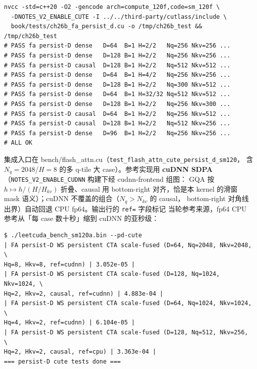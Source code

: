 \begin{lstlisting}[style=console]
nvcc -std=c++20 -O2 -gencode arch=compute_120f,code=sm_120f \
  -DNOTES_V2_ENABLE_CUTE -I ../../third-party/cutlass/include \
  book/tests/ch26b_fa_persist_d.cu -o /tmp/ch26b_test && /tmp/ch26b_test
# PASS fa persist-D dense   D=64  B=1 H=2/2   Nq=256 Nkv=256 ...
# PASS fa persist-D dense   D=128 B=1 H=2/2   Nq=256 Nkv=256 ...
# PASS fa persist-D causal  D=128 B=1 H=2/2   Nq=512 Nkv=512 ...
# PASS fa persist-D dense   D=64  B=1 H=4/2   Nq=256 Nkv=256 ...
# PASS fa persist-D dense   D=128 B=1 H=2/2   Nq=300 Nkv=512 ...
# PASS fa persist-D dense   D=64  B=1 H=32/32 Nq=512 Nkv=512 ...
# PASS fa persist-D dense   D=128 B=1 H=2/2   Nq=256 Nkv=300 ...
# PASS fa persist-D causal  D=64  B=1 H=2/2   Nq=256 Nkv=512 ...
# PASS fa persist-D causal  D=128 B=1 H=2/2   Nq=512 Nkv=256 ...
# PASS fa persist-D dense   D=96  B=1 H=2/2   Nq=256 Nkv=256 ...
# ALL OK
\end{lstlisting}

集成入口在 bench/flash\_attn.cu（\texttt{test\_\allowbreak{}flash\_\allowbreak{}attn\_\allowbreak{}cute\_\allowbreak{}persist\_\allowbreak{}d\_\allowbreak{}sm120}，
含 $N_q{=}2048$/$H{=}8$ 的多 q-tile 大 case）。参考实现用 \textbf{cuDNN SDPA}
（\texttt{NOTES\_\allowbreak{}V2\_\allowbreak{}ENABLE\_CUDNN} 构建下经 cudnn-frontend 组图：
GQA 按 $h\mapsto h/(H/H_{kv})$ 折叠、causal 用 bottom-right 对齐，恰是本
kernel 的滑窗 mask 语义）；cuDNN 不覆盖的组合（$N_q>N_{kv}$ 的 causal，
bottom-right 对角线出界）自动回退 CPU fp64。输出行的 \texttt{ref=} 字段标记
当轮参考来源，fp64 CPU 参考从「每 case 数十秒」缩到 cuDNN 的亚秒级：

\begin{lstlisting}[style=console]
$ ./leetcuda_bench_sm120a.bin --pd-cute
| FA persist-D WS persistent CTA scale-fused (D=64, Nq=2048, Nkv=2048, \
Hq=8, Hkv=8, ref=cudnn) | 3.052e-05 |
| FA persist-D WS persistent CTA scale-fused (D=128, Nq=1024, Nkv=1024, \
Hq=2, Hkv=2, causal, ref=cudnn) | 4.883e-04 |
| FA persist-D WS persistent CTA scale-fused (D=64, Nq=1024, Nkv=1024, \
Hq=4, Hkv=2, ref=cudnn) | 6.104e-05 |
| FA persist-D WS persistent CTA scale-fused (D=128, Nq=512, Nkv=256, \
Hq=2, Hkv=2, causal, ref=cpu) | 3.363e-04 |
=== persist-D cute tests done ===
\end{lstlisting}

